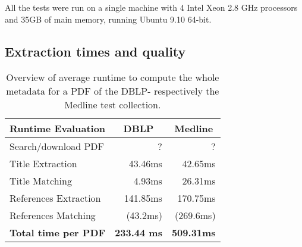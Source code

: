 All the tests were run on a single machine with 4 Intel Xeon 2.8 GHz processors and 35GB of main memory, running Ubuntu 9.10 64-bit.
 
\subsection{Extraction times and quality}\label{sec:experiments_extraction}

\vspace{-1mm}
\begin{table}[ht]
\centering
{\renewcommand{\baselinestretch}{1.3}\normalsize
\hspace*{-2.5mm}
\begin{tabular}{|l|r|r|} \hline
Runtime Evaluation          & \multicolumn{1}{c|}{DBLP} & \multicolumn{1}{c|}{Medline}  \\ \hline
Search/download PDF         &        ? & ? \\
Title Extraction            &  43.46ms &  42.65ms  \\
Title Matching              &   4.93ms &  26.31ms  \\
References Extraction       & 141.85ms & 170.75ms  \\
References Matching         & (43.2ms) & (269.6ms) \\ \hline \hline
\textbf{Total time per PDF} & \textbf{233.44 ms} & \textbf{509.31ms} \\
\hline
\end{tabular}}
\vspace{-3mm}
\caption{Overview of average runtime to compute the whole metadata for a PDF of the DBLP- respectively the Medline test collection. }
\label{table:title-extraction-runtimes2}
\vspace{-2mm}
\end{table}\\


